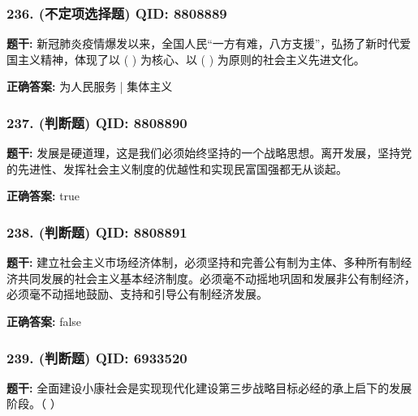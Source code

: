 \documentclass[12pt,UTF8]{ctexart}
\begin{document}
\vspace{0.3em}\hrulefill\vspace{0.7em}

\subsubsection*{236. (不定项选择题) \small QID: 8808889}

\textbf{题干:}
新冠肺炎疫情爆发以来，全国人民“一方有难，八方支援”，弘扬了新时代爱国主义精神，体现了以 ( ) 为核心、以  ( ) 为原则的社会主义先进文化。

\textbf{正确答案:}
为人民服务 | 集体主义

\vspace{0.3em}\hrulefill\vspace{0.7em}

\subsubsection*{237. (判断题) \small QID: 8808890}

\textbf{题干:}
发展是硬道理，这是我们必须始终坚持的一个战略思想。离开发展，坚持党的先进性、发挥社会主义制度的优越性和实现民富国强都无从谈起。

\textbf{正确答案:}
true

\vspace{0.3em}\hrulefill\vspace{0.7em}

\subsubsection*{238. (判断题) \small QID: 8808891}

\textbf{题干:}
建立社会主义市场经济体制，必须坚持和完善公有制为主体、多种所有制经济共同发展的社会主义基本经济制度。必须毫不动摇地巩固和发展非公有制经济，必须毫不动摇地鼓励、支持和引导公有制经济发展。

\textbf{正确答案:}
false

\vspace{0.3em}\hrulefill\vspace{0.7em}

\subsubsection*{239. (判断题) \small QID: 6933520}

\textbf{题干:}
全面建设小康社会是实现现代化建设第三步战略目标必经的承上启下的发展阶段。（ ）
\end{document}
